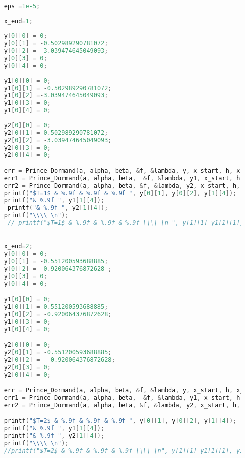 \documentclass{article}
\theoremstyle{remark}
\theoremstyle{definition}
\begin{document}
\begin{lstlisting}[language=C]
    
    eps =1e-5;
    
    x_end=1;
    
    y[0][0] = 0;
    y[0][1] = -0.502989290781072;
    y[0][2] = -3.039474645049093;
    y[0][3] = 0;
    y[0][4] = 0;
    
    y1[0][0] = 0;
    y1[0][1] = -0.502989290781072;
    y1[0][2] =-3.039474645049093;
    y1[0][3] = 0;
    y1[0][4] = 0;
    
    y2[0][0] = 0;
    y2[0][1] =-0.502989290781072;
    y2[0][2] = -3.039474645049093;
    y2[0][3] = 0;
    y2[0][4] = 0;

    err = Prince_Dormand(a, alpha, beta, &f, &lambda, y, x_start, h, x_end, &h_next, eps); 
    err1 = Prince_Dormand(a, alpha, beta,  &f, &lambda, y1, x_start, h, x_end, &h_next, eps*1e-2);
    err2 = Prince_Dormand(a, alpha, beta, &f, &lambda, y2, x_start, h, x_end, &h_next, eps*1e-4);
    printf("$T=1$ & %.9f & %.9f & %.9f ", y[0][1], y[0][2], y[1][4]);
    printf("& %.9f ", y1[1][4]);
     printf("& %.9f ", y2[1][4]);
    printf("\\\\ \n");
     // printf("$T=1$ & %.9f & %.9f & %.9f \\\\ \n ", y[1][1]-y1[1][1], y1[1][1]-y2[1][1], (y[1][1]-y1[1][1])/(y1[1][1]-y2[1][1]));


    x_end=2;
    y[0][0] = 0;
    y[0][1] = -0.551200593688885;
    y[0][2] = -0.920064376872628 ;
    y[0][3] = 0;
    y[0][4] = 0;

    y1[0][0] = 0;
    y1[0][1] =-0.551200593688885;
    y1[0][2] = -0.920064376872628;
    y1[0][3] = 0;
    y1[0][4] = 0;

    y2[0][0] = 0;
    y2[0][1] = -0.551200593688885;
    y2[0][2] =  -0.920064376872628;
    y2[0][3] = 0;
    y2[0][4] = 0;

    err = Prince_Dormand(a, alpha, beta, &f, &lambda, y, x_start, h, x_end, &h_next, eps);
    err1 = Prince_Dormand(a, alpha, beta,  &f, &lambda, y1, x_start, h, x_end, &h_next, eps*1e-2);
    err2 = Prince_Dormand(a, alpha, beta, &f, &lambda, y2, x_start, h, x_end, &h_next, eps*1e-4);

    printf("$T=2$ & %.9f & %.9f & %.9f ", y[0][1], y[0][2], y[1][4]);
    printf("& %.9f ", y1[1][4]);
    printf("& %.9f ", y2[1][4]);
    printf("\\\\ \n");
    //printf("$T=2$ & %.9f & %.9f & %.9f \\\\ \n", y[1][1]-y1[1][1], y1[1][1]-y2[1][1], (y[1][1]-y1[1][1])/(y1[1][1]-y2[1][1]));




\end{lstlisting}
\end{document}
